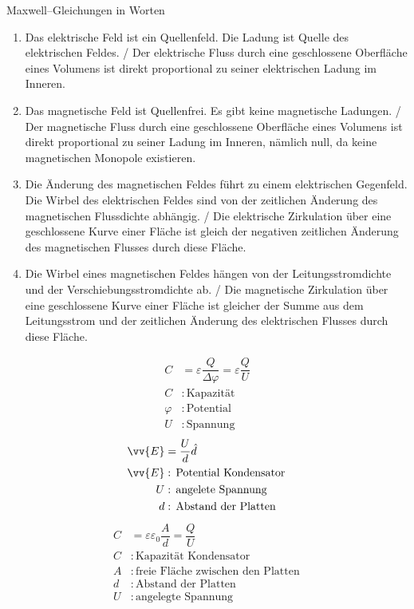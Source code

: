 \documentclass[a4paper,12pt]{article}
\numberwithin{equation}{section}
\begin{document}
Maxwell--Gleichungen in Worten
\begin{enumerate}[label=$\circ$]
        \item Das elektrische Feld ist ein Quellenfeld. Die Ladung ist Quelle des elektrischen Feldes. / Der elektrische Fluss durch eine geschlossene Oberfläche eines Volumens ist direkt proportional zu seiner elektrischen Ladung im Inneren.
        \item Das magnetische Feld ist Quellenfrei. Es gibt keine magnetische Ladungen. / Der magnetische Fluss durch eine geschlossene Oberfläche eines Volumens ist direkt proportional zu seiner Ladung im Inneren, nämlich null, da keine magnetischen Monopole existieren.
        \item Die Änderung des magnetischen Feldes führt zu einem elektrischen Gegenfeld. Die Wirbel des elektrischen Feldes sind von der zeitlichen Änderung des magnetischen Flussdichte abhängig. / Die elektrische Zirkulation über eine geschlossene Kurve einer Fläche ist gleich der negativen zeitlichen Änderung des magnetischen Flusses durch diese Fläche.
        \item Die Wirbel eines magnetischen Feldes hängen von der Leitungsstromdichte und der Verschiebungsstromdichte ab. / Die magnetische Zirkulation über eine geschlossene Kurve einer Fläche ist gleicher der Summe aus dem Leitungsstrom und der zeitlichen Änderung des elektrischen Flusses durch diese Fläche.
\end{enumerate}
\begin{align} 
        C&=\varepsilon \dfrac{Q}{\Delta \varphi }=\varepsilon \dfrac{Q}{U}\\
        C&:\,\text{Kapazität}\,\nonumber \\
        \varphi &:\,\text{Potential}\,\nonumber \\
        U&:\,\text{Spannung}\,\nonumber 
\end{align} 
\begin{align} 
        \vv{E}&=\dfrac{U}{d}\hat{d}\\
        \vv{E}&:\,\text{Potential Kondensator}\,\nonumber \\
        U&:\,\text{angelete Spannung}\,\nonumber \\
        d&:\,\text{Abstand der Platten}\,\nonumber 
\end{align} 
\begin{align} 
        C&=\varepsilon \varepsilon _0\dfrac{A}{d}=\dfrac{Q}{U}\\
        C&:\,\text{Kapazität Kondensator}\,\nonumber \\
        A&:\,\text{freie Fläche zwischen den Platten}\,\nonumber \\
        d&:\,\text{Abstand der Platten}\,\nonumber \\
        U&:\,\text{angelegte Spannung}\,\nonumber 
\end{align} 
\end{document}
